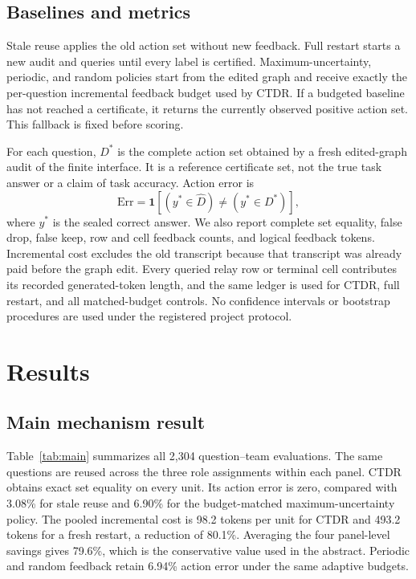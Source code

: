 \documentclass[11pt]{article}
\newcommand{\ctdr}{\textsc{CTDR}}
\newcommand{\err}{\mathrm{Err}}
\begin{document}
\subsection{Baselines and metrics}
Stale reuse applies the old action set without new feedback. Full restart starts a new audit and queries until every label is certified. Maximum-uncertainty, periodic, and random policies start from the edited graph and receive exactly the per-question incremental feedback budget used by \ctdr. If a budgeted baseline has not reached a certificate, it returns the currently observed positive action set. This fallback is fixed before scoring.

For each question, $D^*$ is the complete action set obtained by a fresh edited-graph audit of the finite interface. It is a reference certificate set, not the true task answer or a claim of task accuracy. Action error is
\begin{equation}
\err=\mathbf{1}\left[(y^*\in\hat D)\ne(y^*\in D^*)\right],
\end{equation}
where $y^*$ is the sealed correct answer. We also report complete set equality, false drop, false keep, row and cell feedback counts, and logical feedback tokens. Incremental cost excludes the old transcript because that transcript was already paid before the graph edit. Every queried relay row or terminal cell contributes its recorded generated-token length, and the same ledger is used for CTDR, full restart, and all matched-budget controls. No confidence intervals or bootstrap procedures are used under the registered project protocol.

\section{Results}
\subsection{Main mechanism result}
Table~\ref{tab:main} summarizes all 2,304 question--team evaluations. The same questions are reused across the three role assignments within each panel. \ctdr{} obtains exact set equality on every unit. Its action error is zero, compared with 3.08\% for stale reuse and 6.90\% for the budget-matched maximum-uncertainty policy. The pooled incremental cost is 98.2 tokens per unit for \ctdr{} and 493.2 tokens for a fresh restart, a reduction of 80.1\%. Averaging the four panel-level savings gives 79.6\%, which is the conservative value used in the abstract. Periodic and random feedback retain 6.94\% action error under the same adaptive budgets.
\end{document}
